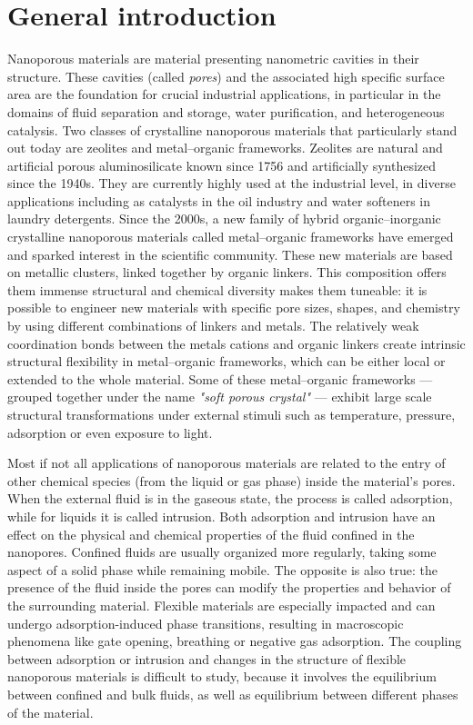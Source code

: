 
\chapter*{General introduction}

Nanoporous materials are material presenting nanometric cavities in their
structure. These cavities (called \emph{pores}) and the associated high specific
surface area are the foundation for crucial industrial applications, in
particular in the domains of fluid separation and storage, water purification,
and heterogeneous catalysis. Two classes of crystalline nanoporous materials
that particularly stand out today are zeolites and metal--organic frameworks.
Zeolites are natural and artificial porous aluminosilicate known since 1756 and
artificially synthesized since the 1940s. They are currently highly used at the
industrial level, in diverse applications including as catalysts in the oil
industry and water softeners in laundry detergents. Since the 2000s, a new
family of hybrid organic--inorganic crystalline nanoporous materials called
metal--organic frameworks have emerged and sparked interest in the scientific
community. These new materials are based on metallic clusters, linked together
by organic linkers. This composition offers them immense structural and chemical
diversity makes them tuneable: it is possible to engineer new materials with
specific pore sizes, shapes, and chemistry by using different combinations of
linkers and metals. The relatively weak coordination bonds between the metals
cations and organic linkers create intrinsic structural flexibility in
metal--organic frameworks, which can be either local or extended to the whole
material. Some of these metal--organic frameworks --- grouped together under the
name \emph{"soft porous crystal"} --- exhibit large scale structural
transformations under external stimuli such as temperature, pressure, adsorption
or even exposure to light.

Most if not all applications of nanoporous materials are related to the entry of
other chemical species (from the liquid or gas phase) inside the material's
pores. When the external fluid is in the gaseous state, the process is called
adsorption, while for liquids it is called intrusion. Both adsorption and
intrusion have an effect on the physical and chemical properties of the fluid
confined in the nanopores. Confined fluids are usually organized more regularly,
taking some aspect of a solid phase while remaining mobile. The opposite is also
true: the presence of the fluid inside the pores can modify the properties and
behavior of the surrounding material. Flexible materials are especially impacted
and can undergo adsorption-induced phase transitions, resulting in macroscopic
phenomena like gate opening, breathing or negative gas adsorption. The coupling
between adsorption or intrusion and changes in the structure of flexible
nanoporous materials is difficult to study, because it involves the equilibrium
between confined and bulk fluids, as well as equilibrium between different
phases of the material.

